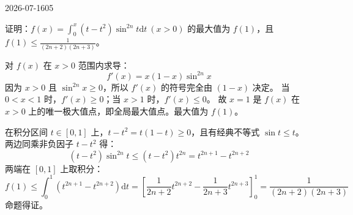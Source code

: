 \begin{mistake}{2026-07-16}{05}

\begin{problemcontent}
证明：\(f(x) = \int_0^x (t - t^2)\sin^{2n}t \mathrm{d}t \ (x > 0)\) 的最大值为 \(f(1)\)，且 \(f(1) \le \frac{1}{(2n+2)(2n+3)}\)。
\end{problemcontent}

\begin{solutioncontent}
对 \(f(x)\) 在 \(x > 0\) 范围内求导：
\[
f'(x) = x(1 - x)\sin^{2n}x
\]
因为 \(x > 0\) 且 \(\sin^{2n}x \ge 0\)，所以 \(f'(x)\) 的符号完全由 \((1 - x)\) 决定。
当 \(0 < x < 1\) 时，\(f'(x) \ge 0\)；当 \(x > 1\) 时，\(f'(x) \le 0\)。
故 \(x=1\) 是 \(f(x)\) 在 \(x>0\) 上的唯一极大值点，即全局最大值点。最大值为 \(f(1)\)。

在积分区间 \(t \in [0, 1]\) 上，\(t - t^2 = t(1-t) \ge 0\)，且有经典不等式 \(\sin t \le t\)。
两边同乘非负因子 \(t-t^2\) 得：
\[
(t - t^2)\sin^{2n}t \le (t - t^2)t^{2n} = t^{2n+1} - t^{2n+2}
\]
两端在 \([0, 1]\) 上取积分：
\[
f(1) \le \int_0^1 (t^{2n+1} - t^{2n+2}) \mathrm{d}t = \left[ \frac{1}{2n+2}t^{2n+2} - \frac{1}{2n+3}t^{2n+3} \right]_0^1 = \frac{1}{(2n+2)(2n+3)}
\]
命题得证。
\end{solutioncontent}


\end{mistake}
